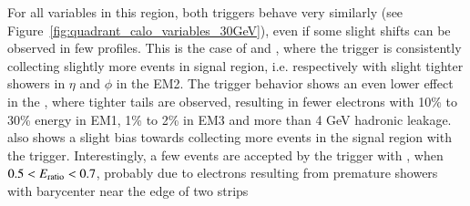 For all variables in this region, both triggers behave very similarly (see Figure~\ref{fig:quadrant_calo_variables_30GeV}), even if some slight shifts can be observed in few profiles. This is the case of \reta{} and \rphi{}, where the \rnn{} trigger is consistently collecting slightly more events in signal region, i.e. respectively with slight tighter showers in $\eta{}$ and $\phi{}$ in the EM2. The \rnn{} trigger behavior shows an even lower effect in the \rhad{}, where tighter tails are observed, resulting in fewer electrons with 10\% to 30\% energy in EM1, 1\% to 2\% in EM3 and more than 4 GeV hadronic leakage. \eratio{} also shows a slight bias towards collecting more events in the signal region with the \rnn{} trigger. Interestingly, a few events are accepted by the trigger with \rnn{}, when $0.5<E_\text{ratio}{}<0.7$, probably due to electrons resulting from premature showers with barycenter near the edge of two strips

